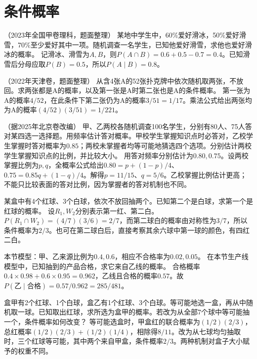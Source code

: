 \par\addvspace{12pt}

\section{条件概率}

（2023年全国甲卷理科，题面整理）
某地中学生中，60\%爱好滑冰，50\%爱好滑雪，70\%至少爱好其中一项。随机调查一名学生，已知他爱好滑雪，求他也爱好滑冰的概率。
\solutionanswer
记滑冰、滑雪为\(A,B\)，则\(P(A\cap B)=0.6+0.5-0.7=0.4\)。已知滑雪后分母应取\(P(B)=0.5\)，所以\(P(A\mid B)=0.8\)。


（2022年天津卷，题面整理）
从含4张A的52张扑克牌中依次随机取两张，不放回。求两张都是A的概率，以及第一张是A时第二张也是A的条件概率。
\solutionanswer
第一张为A的概率\(4/52\)，在此条件下第二张仍为A的概率\(3/51=1/17\)。乘法公式给出两张均为A的概率\((4/52)(3/51)=1/221\)。


（据2025年北京卷改编）
甲、乙两校各随机调查100名学生，分别有80人、75人答对某四选一选择题。用频率估计答对概率。甲校学生掌握知识点时必答对，乙校学生掌握时答对概率为\(0.85\)；两校未掌握者均等可能地猜选四个选项。分别估计两校学生掌握知识点的比例，并比较大小。
\solutionanswer
用答对频率分别估计为\(0.80,0.75\)。设两校掌握比例为\(p,q\)，全概率公式给出\(0.80=p+(1-p)/4\)、\(0.75=0.85q+(1-q)/4\)。解得\(p=11/15\)、\(q=5/6\)。乙校掌握比例估计更高；不能只比较表面的答对比例，因为掌握者的答对机制也不同。


某盒中有4个红球、3个白球，依次不放回抽两个。已知第二个是白球，求第一个是红球的概率。
\solutionanswer
设\(R_1,W_2\)分别表示第一红、第二白。\(P(R_1\cap W_2)=(4/7)(3/6)=2/7\)，而第二球白的概率由对称性为\(3/7\)，所以条件概率为\(2/3\)。也可在第二球白后，直接考察其余六球中第一球的颜色，有四红二白。


本节模型：甲、乙来源比例为\(0.4,0.6\)，相应不合格率为\(0.02,0.05\)。
在本节生产线模型中，已知抽到的产品合格，求它来自乙线的概率。
\solutionanswer
合格概率\(0.4\times0.98+0.6\times0.95=0.962\)，乙线且合格的概率\(0.57\)。故\(P(\text{乙}\mid\text{合格})=0.57/0.962=285/481\)。


盒甲有2个红球、1个白球，盒乙有1个红球、3个白球。等可能地选一盒，再从中随机取一球。已知取出红球，求所选为盒甲的概率。若改为从全部7个球中等可能抽一个，条件概率如何改变？
\solutionanswer
等可能选盒时，甲盒红的联合概率为\((1/2)(2/3)\)，总红概率\((1/2)(2/3)+(1/2)(1/4)\)，相除得\(8/11\)。改为从七球均匀抽取时，三个红球等可能，其中两个来自甲盒，条件概率\(2/3\)。两种机制对盒子大小赋予的权重不同。


